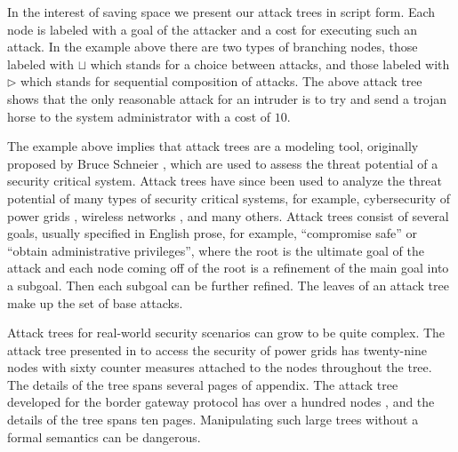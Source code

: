 \documentclass{llncs}
\begin{document}
In the interest of saving space we present our attack trees in script
form.  Each node is labeled with a goal of the attacker and a cost for
executing such an attack. In the example above there are two types of
branching nodes, those labeled with $\sqcup$ which stands for a choice
between attacks, and those labeled with $\rhd$ which stands for
sequential composition of attacks.  The above attack tree shows that
the only reasonable attack for an intruder is to try and send a trojan
horse to the system administrator with a cost of $10$.

The example above implies that attack trees are a modeling tool,
originally proposed by Bruce Schneier \cite{Schneier:1999}, which are
used to assess the threat potential of a security critical system.
Attack trees have since been used to analyze the threat potential of
many types of security critical systems, for example, cybersecurity of
power grids \cite{Ten:2007}, wireless networks \cite{Reinhardt:2012},
and many others.  Attack trees consist of several goals, usually
specified in English prose, for example, ``compromise safe'' or
``obtain administrative privileges'', where the root is the ultimate
goal of the attack and each node coming off of the root is a
refinement of the main goal into a subgoal.  Then each subgoal can be
further refined.  The leaves of an attack tree make up the set of base
attacks.


Attack trees for real-world security scenarios can grow to be quite
complex.  The attack tree presented in \cite{Ten:2007} to access the
security of power grids has twenty-nine nodes with sixty counter
measures attached to the nodes throughout the tree.  The details of
the tree spans several pages of appendix.  The attack tree developed
for the border gateway protocol has over a hundred nodes
\cite{Convey:2003}, and the details of the tree spans ten pages.
Manipulating such large trees without a formal semantics can be
dangerous.
\end{document}
